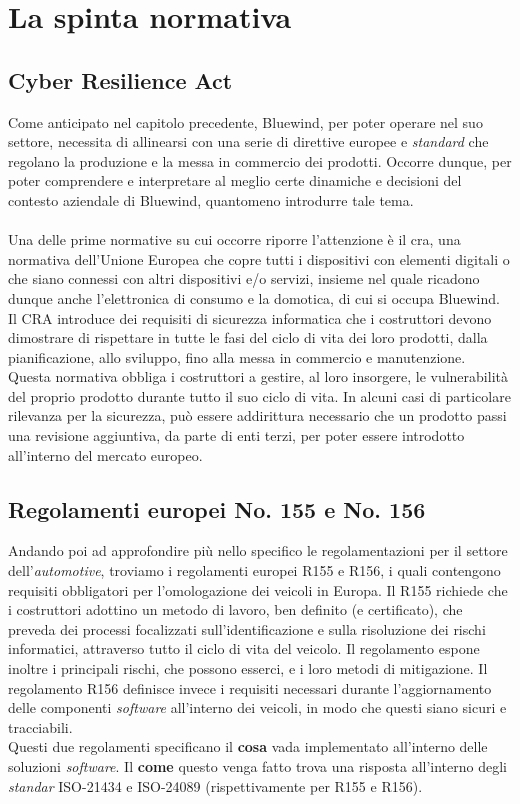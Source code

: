 \section{La spinta normativa}

\subsection{Cyber Resilience Act}
\noindent
Come anticipato nel capitolo precedente, Bluewind, per poter operare nel suo settore, necessita di allinearsi con una serie di direttive europee e \textit{standard} che regolano la produzione e la messa in commercio dei prodotti.
Occorre dunque, per poter comprendere e interpretare al meglio certe dinamiche e decisioni del contesto aziendale di Bluewind, quantomeno introdurre tale tema.\\
\\
\noindent
Una delle prime normative su cui occorre riporre l'attenzione è il \gls{cra}, una normativa dell'Unione Europea che copre tutti i dispositivi con elementi digitali o che siano connessi con altri dispositivi e/o servizi, insieme nel quale ricadono dunque anche l'elettronica di consumo e la domotica, di cui si occupa Bluewind.
Il CRA introduce dei requisiti di sicurezza informatica che i costruttori devono dimostrare di rispettare in tutte le fasi del ciclo di vita dei loro prodotti, dalla pianificazione, allo sviluppo, fino alla messa in commercio e manutenzione.
Questa normativa obbliga i costruttori a gestire, al loro insorgere, le vulnerabilità del proprio prodotto durante tutto il suo ciclo di vita.
In alcuni casi di particolare rilevanza per la sicurezza, può essere addirittura necessario che un prodotto passi una revisione aggiuntiva, da parte di enti terzi, per poter essere introdotto all'interno del mercato europeo.
\subsection{Regolamenti europei No. 155 e No. 156}
\noindent
Andando poi ad approfondire più nello specifico le regolamentazioni per il settore dell'\textit{automotive}, troviamo i regolamenti europei R155 e R156, i quali contengono requisiti obbligatori per l'omologazione dei veicoli in Europa.
Il R155 richiede che i costruttori adottino un metodo di lavoro, ben definito (e certificato), che preveda dei processi focalizzati sull'identificazione e sulla risoluzione dei rischi informatici, attraverso tutto il ciclo di vita del veicolo.
Il regolamento espone inoltre i principali rischi, che possono esserci, e i loro metodi di mitigazione.
Il regolamento R156 definisce invece i requisiti necessari durante l'aggiornamento delle componenti \textit{software} all'interno dei veicoli, in modo che questi siano sicuri e tracciabili.\\
Questi due regolamenti specificano il \textbf{cosa} vada implementato all'interno delle soluzioni \textit{software}. Il \textbf{come} questo venga fatto trova una risposta all'interno degli \textit{standar} ISO-21434 e ISO-24089 (rispettivamente per R155 e R156).
